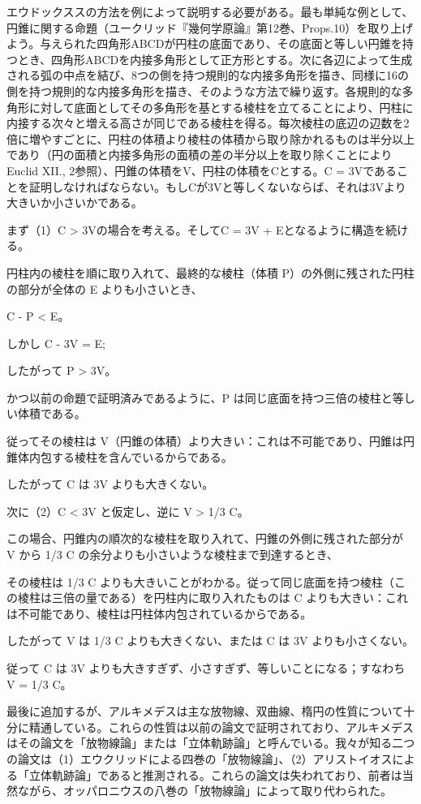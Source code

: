 \documentclass[a4paper,11pt,openany]{ltjsbook}
\begin{document}
エウドックススの方法を例によって説明する必要がある。最も単純な例として、円錐に関する命題（ユークリッド『幾何学原論』第12巻、Props.10）を取り上げよう。与えられた四角形ABCDが円柱の底面であり、その底面と等しい円錐を持つとき、四角形ABCDを内接多角形として正方形とする。次に各辺によって生成される弧の中点を結び、8つの側を持つ規則的な内接多角形を描き、同様に16の側を持つ規則的な内接多角形を描き、そのような方法で繰り返す。各規則的な多角形に対して底面としてその多角形を基とする棱柱を立てることにより、円柱に内接する次々と増える高さが同じである棱柱を得る。每次棱柱の底辺の辺数を2倍に増やすごとに、円柱の体積より棱柱の体積から取り除かれるものは半分以上であり（円の面積と内接多角形の面積の差の半分以上を取り除くことによりEuclid XII., 2参照）、円錐の体積をV、円柱の体積をCとする。C = 3Vであることを証明しなければならない。もしCが3Vと等しくないならば、それは3Vより大きいか小さいかである。

まず（1）C > 3Vの場合を考える。そしてC = 3V + Eとなるように構造を続ける。

円柱内の棱柱を順に取り入れて、最終的な棱柱（体積 P）の外側に残された円柱の部分が全体の E よりも小さいとき、

C - P < E。

しかし C - 3V = E;

したがって P > 3V。

かつ以前の命題で証明済みであるように、P は同じ底面を持つ三倍の棱柱と等しい体積である。

従ってその棱柱は V（円錐の体積）より大きい：これは不可能であり、円錐は円錐体内包する棱柱を含んでいるからである。

したがって C は 3V よりも大きくない。

次に（2）C < 3V と仮定し、逆に V > 1/3 C。

この場合、円錐内の順次的な棱柱を取り入れて、円錐の外側に残された部分が V から 1/3 C の余分よりも小さいような棱柱まで到達するとき、

その棱柱は 1/3 C よりも大きいことがわかる。従って同じ底面を持つ棱柱（この棱柱は三倍の量である）を円柱内に取り入れたものは C よりも大きい：これは不可能であり、棱柱は円柱体内包されているからである。

したがって V は 1/3 C よりも大きくない、または C は 3V よりも小さくない。

従って C は 3V よりも大きすぎず、小さすぎず、等しいことになる；すなわち V = 1/3 C。

最後に追加するが、アルキメデスは主な放物線、双曲線、楕円の性質について十分に精通している。これらの性質は以前の論文で証明されており、アルキメデスはその論文を「放物線論」または「立体軌跡論」と呼んでいる。我々が知る二つの論文は（1）エウクリッドによる四巻の「放物線論」、（2）アリストイオスによる「立体軌跡論」であると推測される。これらの論文は失われており、前者は当然ながら、オッパロニウスの八巻の「放物線論」によって取り代わられた。
\end{document}
